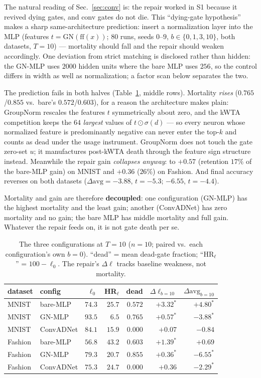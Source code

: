 \documentclass[review]{elsarticle}
\begin{document}
The natural reading of Sec.~\ref{sec:conv} is: the repair worked in
S1 because it revived dying gates, and conv gates do not die. This
``dying-gate hypothesis'' makes a sharp same-architecture prediction:
insert a normalization layer into the MLP (features $t =
\mathrm{GN}(\mathrm{ff}(x))$; $80$ runs,
seeds $0$--$9$, $b \in \{0,1,3,10\}$, both datasets, $T{=}10$) ---
mortality should fall and the repair should weaken accordingly.
One deviation from strict matching is disclosed rather than hidden:
the GN-MLP uses $2000$ hidden units where the bare MLP uses $256$, so
the control differs in width as well as normalization; a factor scan
below separates the two.

The prediction fails in both halves (Table~\ref{tab:three}, middle
rows). Mortality \emph{rises} ($0.765$/$0.855$ vs.\ bare's
$0.572$/$0.603$), for a reason the architecture makes plain:
GroupNorm rescales the features $t$ symmetrically about zero, and the
kWTA competition keeps the $64$ \emph{largest} values of $t \odot
\sigma(d)$ --- so every neuron whose normalized feature is
predominantly negative can never enter the top-$k$ and counts as
dead under the usage instrument. GroupNorm does not touch the gate
zero-set $u$; it manufactures post-kWTA death through the feature
sign structure instead. Meanwhile the repair gain \emph{collapses
anyway}: to
$+0.57$ (retention $17\%$ of the bare-MLP gain) on MNIST and $+0.36$
($26\%$) on Fashion. And final accuracy reverses on both datasets
($\Delta\mathrm{avg} = -3.88$, $t{=}-5.3$; $-6.55$, $t{=}-4.4$).

Mortality and gain are therefore \textbf{decoupled}: one configuration
(GN-MLP) has the highest mortality and the least gain; another
(ConvADNet) has zero mortality and no gain; the bare MLP has middle
mortality and full gain. Whatever the repair feeds on, it is not gate
death per se.

\begin{table}[t]
\centering\small
\caption{The three configurations at $T{=}10$ ($n{=}10$; paired
vs.\ each configuration's own $b{=}0$). ``dead'' = mean dead-gate
fraction; ``HR$_\ell$'' = $100 - \ell_0$. The repair's
$\Delta\ell$ tracks baseline weakness, not mortality.}
\label{tab:three}
\begin{tabular}{llrrrrr}
\toprule
dataset & config & $\ell_0$ & HR$_\ell$ & dead &
$\Delta\ell_{b=10}$ & $\Delta\mathrm{avg}_{b=10}$ \\
\midrule
MNIST & bare-MLP & $74.3$ & $25.7$ & $0.572$ &
$+3.32^{*}$ & $+4.80^{*}$ \\
MNIST & GN-MLP & $93.5$ & $6.5$ & $\mathbf{0.765}$ &
$+0.57^{*}$ & $-3.88^{*}$ \\
MNIST & ConvADNet & $84.1$ & $15.9$ & $\mathbf{0.000}$ &
$+0.07$ & $-0.84$ \\
\midrule
Fashion & bare-MLP & $56.8$ & $43.2$ & $0.603$ &
$+1.39^{*}$ & $+0.69$ \\
Fashion & GN-MLP & $79.3$ & $20.7$ & $\mathbf{0.855}$ &
$+0.36^{*}$ & $-6.55^{*}$ \\
Fashion & ConvADNet & $75.3$ & $24.7$ & $\mathbf{0.000}$ &
$+0.36$ & $-2.29^{*}$ \\
\bottomrule
\end{tabular}
\end{table}
\end{document}
